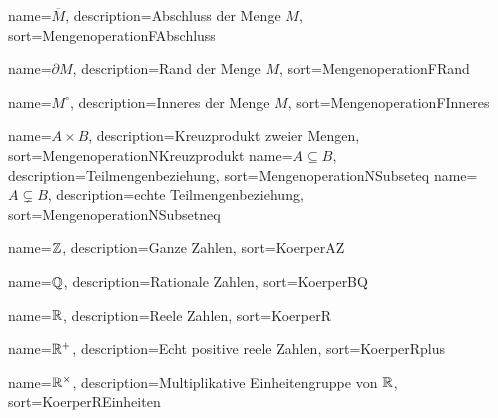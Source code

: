 
{
  name={\ensuremath{\overline{M}}},
  description={Abschluss der Menge $M$},
  sort=MengenoperationFAbschluss
}

{
  name={\ensuremath{\partial M}},
  description={Rand der Menge $M$},
  sort=MengenoperationFRand
}

{
  name={\ensuremath{M^\circ}},
  description={Inneres der Menge $M$},
  sort=MengenoperationFInneres
}

{
  name={\ensuremath{A \times B}},
  description={Kreuzprodukt zweier Mengen},
  sort=MengenoperationNKreuzprodukt
}
{
  name={\ensuremath{A \subseteq B}},
  description={Teilmengenbeziehung},
  sort=MengenoperationNSubseteq
}
{
  name={\ensuremath{A \subsetneq B}},
  description={echte Teilmengenbeziehung},
  sort=MengenoperationNSubsetneq
}


{
  name={\ensuremath{\mdz}},
  description={Ganze Zahlen},
  sort=KoerperAZ
}

{
  name={\ensuremath{\mdq}},
  description={Rationale Zahlen},
  sort=KoerperBQ
}

{
  name={\ensuremath{\mdr}},
  description={Reele Zahlen},
  sort=KoerperR
}

{
  name={\ensuremath{\mdr^+}},
  description={Echt positive reele Zahlen},
  sort=KoerperRplus
}

{
  name={\ensuremath{\mdr^\times}},
  description={Multiplikative Einheitengruppe von $\mathbb{R}$},
  sort=KoerperREinheiten
}

